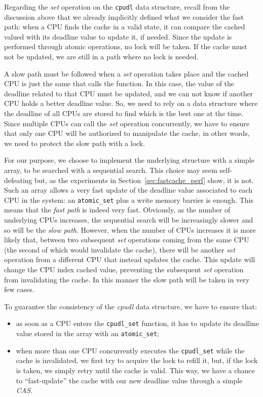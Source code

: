 Regarding the \emph{set} operation on the \texttt{cpudl} data structure, recall 
from the discussion above that we already implicitly defined what we consider the
fast path: when a CPU finds the cache in a valid state, it can
compare the cached valued with its deadline value to update it, if needed. Since
the update is performed through atomic operations, no lock will be taken. If the
cache must not be updated, we are still in a path where no lock is needed.

A slow path must be followed when a \emph{set} operation takes place and the 
cached CPU is just the same that calls the function. In this case, the value
of the deadline related to that CPU must be updated, and we can not know if
another CPU holds a better deadline value. So, we need to rely on a data structure
where the deadline of all CPUs are stored to find which is the best one at the
time. Since multiple CPUs can call the \emph{set} operation concurrently, we have
to ensure that only one CPU will be authorized to manipulate the cache, in other
words, we need to protect the slow path with a lock.

For our purpose, we choose to implement the underlying structure with a simple
array, to be searched with a sequential search. This choice may seem self-defeating
but, as the experiments in Section~\ref{sec:fastcache_perf} show, it is not. Such an array allows
a very fast update of the deadline value associated to each CPU in the system: an
\texttt{atomic\_set} plus a write memory barrier is enough. This means that the
\emph{fast path} is indeed very fast. Obviously, as the number of underlying
CPUs increases, the sequential search will be increasingly slower and so will
be the \emph{slow path}. However,
when the number of CPUs increases it is more likely that, between two subsequent
\emph{set} operations coming from the same CPU (the second of which would invalidate the cache), 
there will be another \emph{set} operation from a different CPU that instead updates the 
cache. This update will change the CPU index cached value, preventing the subsequent
\emph{set} operation from invalidating the cache. 
In this manner the slow path will be taken in very few cases.

To guarantee the consistency of the \emph{cpudl} data structure, we have
to ensure that:

\begin{itemize}
\item as soon as a CPU enters the \texttt{cpudl\_set} function, it has to
update its deadline value stored in the array with an \texttt{atomic\_set};
\item when more than one CPU concurrently executes the \texttt{cpudl\_set}
while the cache is invalidated, we first try to acquire the lock to refill
it, but, if the lock is taken, we simply retry until the cache is valid. This
way, we have a chance to ``fast-update'' the cache with our new deadline value
through a simple \emph{CAS}.
\end{itemize}


